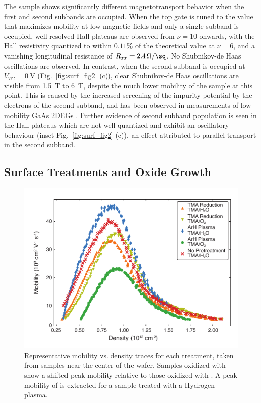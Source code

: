 The sample shows significantly different magnetotransport behavior when the first and second subbands are occupied. When the top gate is tuned to the value that maximizes mobility at low magnetic fields and only a single subband is occupied, well resolved Hall plateaus are observed from $\nu = 10$ onwards, with the Hall resistivity quantized to within $0.11\%$ of the theoretical value at $\nu = 6$, and a vanishing longitudinal resistance of $R_{xx} = \SI[per-mode=symbol]{2.4}{\ohm\per\sq}$. No Shubnikov-de Haas oscillations are observed. In contrast, when the second subband is occupied at $V_{TG} = \SI{0}{\volt}$ (Fig.~\ref{fig:surf_fig2} (c)), clear Shubnikov-de Haas oscillations are visible from \SI{1.5}{\tesla} to \SI{6}{\tesla}, despite the much lower mobility of the sample at this point. This is caused by the increased screening of the impurity potential by the electrons of the second subband, and has been observed in measurements of low-mobility GaAs 2DEGs \cite{PhysRevB.38.7866}. Further evidence of second subband population is seen in the Hall plateaus which are not well quantized and exhibit an oscillatory behaviour (inset Fig.~\ref{fig:surf_fig2} (c)), an effect attributed to parallel transport in the second subband.

\subsection{\label{sec:surf_treat}Surface Treatments and Oxide Growth}

\begin{figure}
    \includegraphics[width=0.6\linewidth]{Figure3}
    \caption[Representative mobility vs. density traces for each treatment]{\label{fig:surf_fig3} Representative mobility vs. density traces for each treatment, taken from samples near the center of the wafer. Samples oxidized with  show a shifted peak mobility relative to those oxidized with . A peak mobility of  is extracted for a sample treated with a Hydrogen plasma.}
\end{figure}

